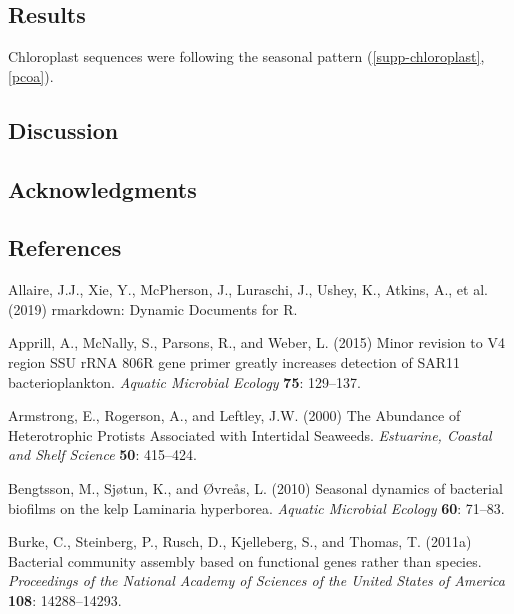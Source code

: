 \documentclass[12pt,]{article}
\begin{document}
\hypertarget{results}{%
\subsection{Results}\label{results}}

Chloroplast sequences were following the seasonal pattern
(\autoref{supp-chloroplast}, \autoref{pcoa}).

\hypertarget{discussion}{%
\subsection{Discussion}\label{discussion}}

\hypertarget{acknowledgments}{%
\subsection{Acknowledgments}\label{acknowledgments}}

\newpage

\hypertarget{references}{%
\subsection{References}\label{references}}

\hypertarget{refs}{}
\leavevmode\hypertarget{ref-Allaire2019}{}%
Allaire, J.J., Xie, Y., McPherson, J., Luraschi, J., Ushey, K., Atkins,
A., et al. (2019) rmarkdown: Dynamic Documents for R.

\leavevmode\hypertarget{ref-Apprill2015}{}%
Apprill, A., McNally, S., Parsons, R., and Weber, L. (2015) Minor
revision to V4 region SSU rRNA 806R gene primer greatly increases
detection of SAR11 bacterioplankton. \emph{Aquatic Microbial Ecology}
\textbf{75}: 129--137.

\leavevmode\hypertarget{ref-Armstrong2000}{}%
Armstrong, E., Rogerson, A., and Leftley, J.W. (2000) The Abundance of
Heterotrophic Protists Associated with Intertidal Seaweeds.
\emph{Estuarine, Coastal and Shelf Science} \textbf{50}: 415--424.

\leavevmode\hypertarget{ref-Bengtsson2010}{}%
Bengtsson, M., Sjøtun, K., and Øvreås, L. (2010) Seasonal dynamics of
bacterial biofilms on the kelp Laminaria hyperborea. \emph{Aquatic
Microbial Ecology} \textbf{60}: 71--83.

\leavevmode\hypertarget{ref-Burke2011a}{}%
Burke, C., Steinberg, P., Rusch, D., Kjelleberg, S., and Thomas, T.
(2011a) Bacterial community assembly based on functional genes rather
than species. \emph{Proceedings of the National Academy of Sciences of
the United States of America} \textbf{108}: 14288--14293.
\end{document}
